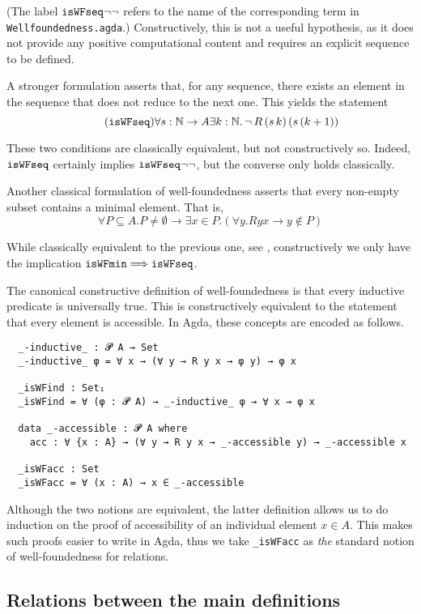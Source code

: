 (The label $\mathtt{isWFseq}{\lnot\lnot}$ refers to the name of the corresponding term in \texttt{Wellfoundedness.agda}.)
Constructively, this is not a useful hypothesis, as it does not provide any positive computational content and requires an explicit sequence to be defined.

A stronger formulation asserts that, for any sequence, there exists an element
in the sequence that does not reduce to the next one.  This yields the statement
\[\tag{$\isWFseq$} \forall s : \nat \to A \exists k : \nat.\, \lnot \, R \,(s\,k)\,(s\,(k+1)) \]

These two conditions are classically equivalent, but not constructively so.
Indeed, $\mathtt{isWFseq}$ certainly implies $\mathtt{isWFseq}{\lnot\lnot}$, but the converse only holds classically.

Another classical formulation of well-foundedness
asserts that every non-empty subset
contains a minimal element.  That is,
\[ \tag{$\isWFmin$} \forall P \subseteq A. P \neq \emptyset \to \exists x \in P. (\forall y. Ryx \to y\notin P) \]

While classically equivalent to the previous one, see \cite[Exercise A.1.8]{Terese},
constructively we only have the implication $\mathtt{isWFmin} \Longrightarrow \mathtt{isWFseq}$.

The canonical constructive definition of well-foundedness is that
every inductive predicate is universally true.
This is constructively equivalent to the statement that every element
is accessible.  In Agda, these concepts are encoded as follows.
{\small
\begin{verbatim}
  _-inductive_ : 𝓟 A → Set
  _-inductive_ φ = ∀ x → (∀ y → R y x → φ y) → φ x

  _isWFind : Set₁
  _isWFind = ∀ (φ : 𝓟 A) → _-inductive_ φ → ∀ x → φ x

  data _-accessible : 𝓟 A where
    acc : ∀ {x : A} → (∀ y → R y x → _-accessible y) → _-accessible x

  _isWFacc : Set
  _isWFacc = ∀ (x : A) → x ∈ _-accessible
\end{verbatim}
}
Although the two notions are equivalent, the latter definition allows us to do induction on the proof of accessibility of an individual element $x \in A$.  This makes such proofs easier to write in Agda, thus we take
\verb|_isWFacc| as \emph{the} standard notion of well-foundedness for relations.

\subsection{Relations between the main definitions}

